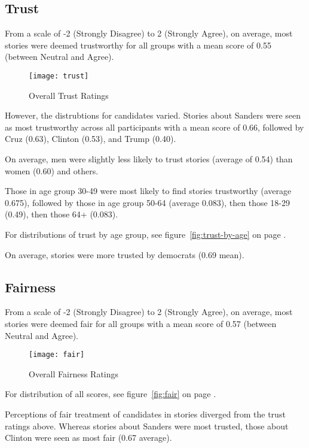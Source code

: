 \newpage
\subsection{Trust}
From a scale of -2 (Strongly Disagree) to 2 (Strongly Agree), on average, most stories were deemed trustworthy for all groups with a mean score of 0.55 (between Neutral and Agree). 

\begin{figure}[H]  
\centering 
  \texttt{[image: trust]}  
  \caption{Overall Trust Ratings
    \label{fig:trust}}
\end{figure}

However, the distrubtions for candidates varied. Stories about Sanders were seen as most trustworthy across all participants with a mean score of 0.66, followed by Cruz (0.63), Clinton (0.53), and Trump (0.40).
 

On average, men were slightly less likely to trust stories (average of 0.54) than women (0.60) and others. 

Those in age group 30-49 were most likely to find stories trustworthy (average 0.675), followed by those in age group 50-64 (average 0.083), then those 18-29 (0.49), then those 64+ (0.083).

For distributions of trust by age group, see figure~\ref{fig:trust-by-age} on page \pageref{fig:trust-by-age}.

On average, stories were more trusted by democrats (0.69 mean).
 
\subsection{Fairness}
From a scale of -2 (Strongly Disagree) to 2 (Strongly Agree), on average, most stories were deemed fair for all groups with a mean score of 0.57 (between Neutral and Agree). 

\begin{figure}[H]  
\centering 
  \texttt{[image: fair]}  
  \caption{Overall Fairness Ratings 
  \label{fig:fairness}}
\end{figure}

For distribution of all scores, see figure~\ref{fig:fair} on page \pageref{fig:fair}.

Perceptions of fair treatment of candidates in stories diverged from the trust ratings above. Whereas stories about Sanders were most trusted, those about Clinton were seen as most fair (0.67 average).

